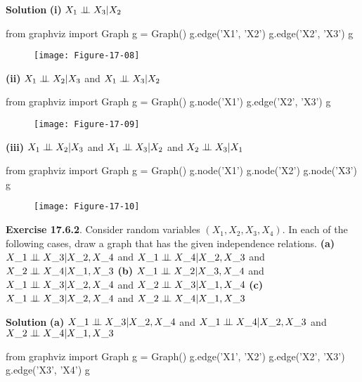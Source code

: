 \textbf{Solution}
\textbf{(i)} \(X_{1} \perp\!\!\!\perp X_{3} | X_{2}\)

\begin{python}
from graphviz import Graph
g = Graph()
g.edge('X1', 'X2')
g.edge('X2', 'X3')
g
\end{python}

\begin{figure}[H]
\centering
\texttt{[image: Figure-17-08]}
\end{figure}

\textbf{(ii)} \(X_{1} \perp\!\!\!\perp X_{2} | X_{3}\) and
\(X_{1} \perp\!\!\!\perp X_{3} | X_{2}\)

\begin{python}
from graphviz import Graph
g = Graph()
g.node('X1')
g.edge('X2', 'X3')
g
\end{python}

\begin{figure}[H]
\centering
\texttt{[image: Figure-17-09]}
\end{figure}

\textbf{(iii)} \(X_{1} \perp\!\!\!\perp X_{2} | X_{3}\) and
\(X_{1} \perp\!\!\!\perp X_{3} | X_{2}\) and \(X_{2} \perp\!\!\!\perp X_{3} | X_{1}\)

\begin{python}
from graphviz import Graph
g = Graph()
g.node('X1')
g.node('X2')
g.node('X3')
g
\end{python}

\begin{figure}[H]
\centering
\texttt{[image: Figure-17-10]}
\end{figure}


\textbf{Exercise 17.6.2}. Consider random variables
\((X_{1}, X_{2}, X_{3}, X_{4})\). In each of the following cases, draw a graph
that has the given independence relations.
\textbf{(a)} $X\_{1} \perp\!\!\!\perp X\_{3} | X\_{2}, X\_{4} $ and $X\_{1}
\perp\!\!\!\perp X\_{4} | X\_{2}, X\_{3} $ and $X\_{2} \perp\!\!\!\perp X\_{4}
| X\_{1}, X\_{3} $
\textbf{(b)} $X\_{1} \perp\!\!\!\perp X\_{2} | X\_{3}, X\_{4} $ and $X\_{1}
\perp\!\!\!\perp X\_{3} | X\_{2}, X\_{4} $ and $X\_{2} \perp\!\!\!\perp X\_{3}
| X\_{1}, X\_{4} $
\textbf{(c)} $X\_{1} \perp\!\!\!\perp X\_{3} | X\_{2}, X\_{4} $ and $X\_{2}
\perp\!\!\!\perp X\_{4} | X\_{1}, X\_{3} $

\textbf{Solution}
\textbf{(a)} $X\_{1} \perp\!\!\!\perp X\_{3} | X\_{2}, X\_{4} $ and $X\_{1}
\perp\!\!\!\perp X\_{4} | X\_{2}, X\_{3} $ and $X\_{2} \perp\!\!\!\perp X\_{4}
| X\_{1}, X\_{3} $

\begin{python}
from graphviz import Graph
g = Graph()
g.edge('X1', 'X2')
g.edge('X2', 'X3')
g.edge('X3', 'X4')
g
\end{python}


